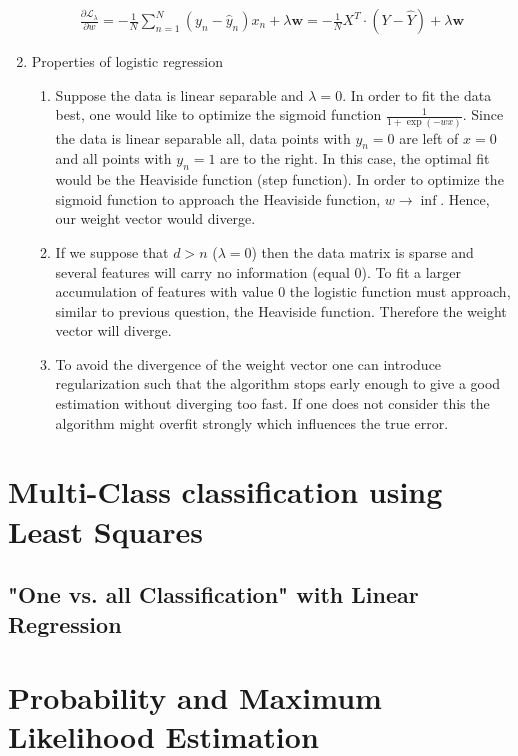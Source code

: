 \documentclass[12pt]{article}
\begin{document}
\begin{enumerate}
\begin{align*}
	\frac{\partial \mathcal{L}_\lambda}{\partial w} = -\frac{1}{N} \sum_{n=1}^{N} \left( y_n - \hat{y}_n \right) x_n + \lambda \textbf{w} = - \frac{1}{N} X^T \cdot \left( Y - \hat{Y} \right) + \lambda \textbf{w}
	\end{align*} 
	\item Properties of logistic regression
	\begin{enumerate}[label=(\alph*)]
		\item Suppose the data is linear separable and $\lambda=0$. In order to fit the data best, one would like to optimize the sigmoid function $\frac{1}{1+\exp(-wx)}$. Since the data is linear separable all, data points with $y_n=0$ are left of $x=0$ and all points with $y_n=1$ are to the right. In this case, the optimal fit would be the Heaviside function (step function). In order to optimize the sigmoid function to approach the Heaviside function, $w\rightarrow \inf$. Hence, our weight vector would diverge. 
		\item If we suppose that $d>n$ ($\lambda=0$) then the data matrix is sparse and several features will carry no information (equal 0). To fit a larger accumulation of features with value 0 the logistic function must approach, similar to previous question, the Heaviside function. Therefore the weight vector will diverge.
		\item To avoid the divergence of the weight vector one can introduce regularization such that the algorithm stops early enough to give a good estimation without diverging too fast. If one does not consider this the algorithm might overfit strongly which influences the true error.
	\end{enumerate}
						
\end{enumerate}

\newpage

\section{Multi-Class classification using Least Squares}

\subsection{"One vs. all Classification" with Linear Regression}

\newpage

\section{Probability and Maximum Likelihood Estimation}
\end{document}
